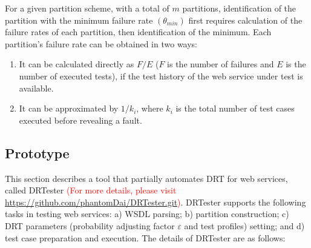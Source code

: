 \documentclass[10pt,journal,compsoc]{IEEEtran}
\begin{document}
For a given partition scheme, with a total of $m$ partitions, identification of the partition with the minimum failure rate $(\theta_{min})$ first requires calculation of the failure rates of each partition, then identification of the minimum. Each partition's failure rate can be obtained in two ways:
\begin{enumerate}[1)]
  \item
  It can be calculated directly as $F / E$ ($F$ is the number of failures and $E$ is the number of executed tests), if the test history of the web service under test is available.

  \item
  It can be approximated by $1 / k_i$, where $k_i$ is the total number of test cases executed before revealing a fault.
\end{enumerate}


\subsection{Prototype}
\label{sec:prototype}

This section describes a tool that partially automates DRT for web services, called DRTester \textcolor{red}{(For more details, please visit \url{https://github.com/phantomDai/DRTester.git})}. DRTester supports the following tasks in testing web services: a) WSDL parsing; b) partition construction; c) DRT parameters (probability adjusting factor $\varepsilon$ and test profiles) setting; and d) test case preparation and execution. The details of DRTester are as follows:
\end{document}
